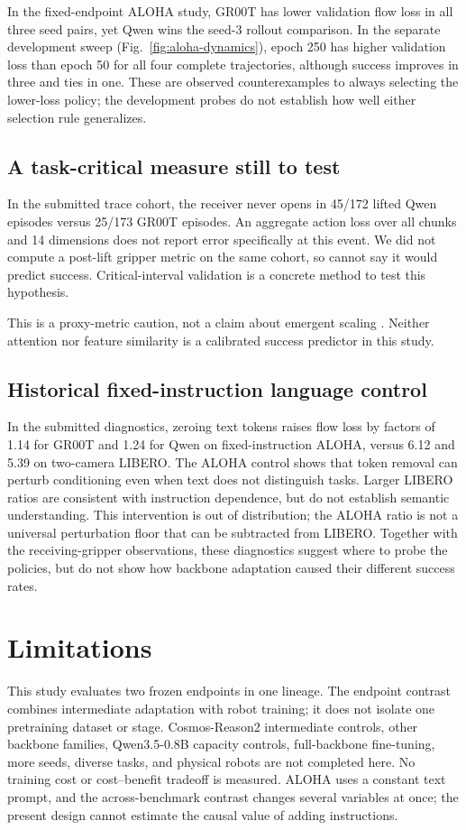 \documentclass[conference]{IEEEtran}
\begin{document}
In the fixed-endpoint ALOHA study, GR00T has lower validation flow loss in
all three seed pairs, yet Qwen wins the seed-3 rollout comparison. In the
separate development sweep (Fig.~\ref{fig:aloha-dynamics}), epoch 250 has
higher validation loss than epoch 50 for all four complete trajectories,
although success improves in three and ties in one. These are observed
counterexamples to always selecting the lower-loss policy; the development
probes do not establish how well either selection rule generalizes.

\subsection{A task-critical measure still to test}
In the submitted trace cohort, the receiver never opens in 45/172 lifted
Qwen episodes versus 25/173 GR00T episodes. An aggregate action loss over
all chunks and 14 dimensions does not report error specifically at this
event. We did not compute a post-lift gripper metric on the same cohort,
so cannot say it would predict success. Critical-interval validation
\cite{cimse} is a concrete method to test this hypothesis.

This is a proxy-metric caution, not a claim about emergent scaling
\cite{emergent}. Neither attention nor feature similarity is a calibrated
success predictor in this study.

\subsection{Historical fixed-instruction language control}
In the submitted diagnostics, zeroing text tokens raises flow loss by factors
of 1.14 for GR00T and 1.24 for Qwen on fixed-instruction ALOHA, versus 6.12
and 5.39 on two-camera LIBERO. The ALOHA control shows that token removal can
perturb conditioning even when text does not distinguish tasks. Larger LIBERO
ratios are consistent with instruction dependence, but do not establish semantic
understanding. This intervention is out of distribution; the ALOHA ratio is not
a universal perturbation floor that can be subtracted from LIBERO. Together
with the receiving-gripper observations, these diagnostics suggest where to
probe the policies, but do not show how backbone adaptation caused their
different success rates.

\section{Limitations}
This study evaluates two frozen endpoints in one lineage. The endpoint contrast
combines intermediate adaptation with robot training; it does not isolate one
pretraining dataset or stage. Cosmos-Reason2 intermediate controls, other
backbone families, Qwen3.5-0.8B capacity controls, full-backbone fine-tuning,
more seeds, diverse tasks, and physical robots are not completed here. No
training cost or cost--benefit tradeoff is measured. ALOHA uses a constant
text prompt, and the across-benchmark contrast changes several variables at once;
the present design cannot estimate the causal value of adding instructions.
\end{document}

